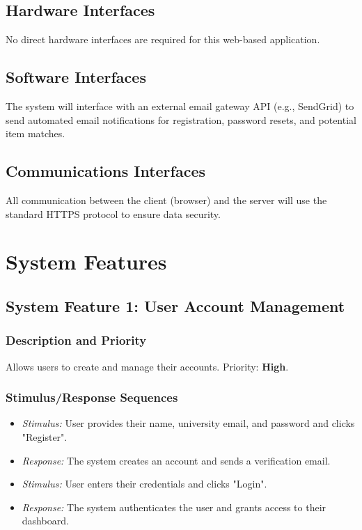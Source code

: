 \documentclass[11pt, a4paper]{article}
\begin{document}
\subsection{Hardware Interfaces}
No direct hardware interfaces are required for this web-based application.

\subsection{Software Interfaces}
The system will interface with an external email gateway API (e.g., SendGrid) to send automated email notifications for registration, password resets, and potential item matches.

\subsection{Communications Interfaces}
All communication between the client (browser) and the server will use the standard HTTPS protocol to ensure data security.

\section{System Features}

\subsection{System Feature 1: User Account Management}
\subsubsection{Description and Priority}
Allows users to create and manage their accounts. Priority: \textbf{High}.

\subsubsection{Stimulus/Response Sequences}
\begin{itemize}
    \item \textit{Stimulus:} User provides their name, university email, and password and clicks "Register".
    \item \textit{Response:} The system creates an account and sends a verification email.
    \item \textit{Stimulus:} User enters their credentials and clicks "Login".
    \item \textit{Response:} The system authenticates the user and grants access to their dashboard.
\end{itemize}
\end{document}
